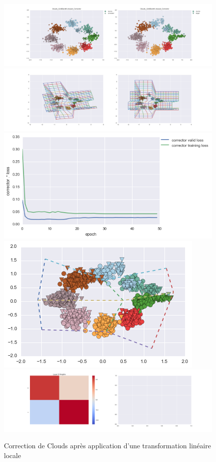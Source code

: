 \begin{figure}[H] %
\centering
\includegraphics[width=\linewidth]{fig/24-05-2016/clouds/Clouds_GridBendK-closest_Corrector-DATA.png}
\includegraphics[width=\linewidth]{fig/24-05-2016/clouds/Clouds_GridBendK-closest_Corrector-GridCheck.png}
\includegraphics[width=0.45\linewidth]{fig/24-05-2016/clouds/Clouds_GridBendK-closest_Corrector-Learning_curve.png}
\includegraphics[width=0.45\linewidth]{fig/24-05-2016/clouds/cloud_grid.png}
\includegraphics[width=\linewidth]{fig/24-05-2016/clouds/Clouds_GridBendK-closest_Corrector-W.png}
\caption{Correction de Clouds après application d'une transformation linéaire locale}
\label{fig:recap-clouds-GridBend-exhaustive}
\end{figure}

